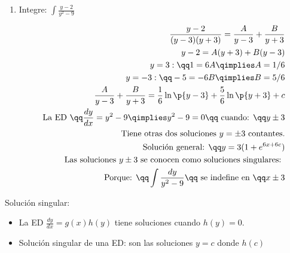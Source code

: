 \begin{enumerate}
    \item Integre: $\displaystyle \int \frac{y-2}{y^2-9}$ 
        \begin{center}
           \begin{align*}
               \frac{y-2}{(y-3)(y+3)} = \frac{A}{y-3} + \frac{B}{y+3} \\ 
               y-2 = A(y+3)+B(y-3) \\ 
                y=3: \qq  1 = 6A \qimplies A = 1/6 \\ 
                y =-3: \qq -5 = -6B \qimplies B = 5/6 \\ 
                \frac{A}{y-3} + \frac{B}{y+3} = \frac{1}{6}\ln\p{ y-3 } + \frac{5}{6}\ln\p{ y+3 } +c \\  
                \text{ La ED } \qq  \frac{d y}{d x} =y^2-9 \qimplies y^2-9=0 \qq \text{ cuando: } \qq y \pm 3 \\ 
                \text{ Tiene otras dos soluciones $y = \pm 3$ contantes.} \\ 
                \text{ Solución general:  } \qq y = 3(1+e^{6x+6c}) \\ 
                \text{ Las soluciones $y\pm 3$ se conocen como soluciones singulares: } \\ 
                \text{ Porque:  } \qq \int \frac{dy}{y^2-9} \qq \text{ se indefine en  } \qq x\pm 3 \\ 
           \end{align*}
        \end{center}
\end{enumerate}

Solución singular:
\begin{itemize}
    \item La ED $\displaystyle \frac{dy}{dx}=g(x)h(y)$  tiene soluciones cuando $h(y)=0$.
    \item Solución singular de una ED: son las soluciones $y=c$  donde $h(c)$ 
\end{itemize}
